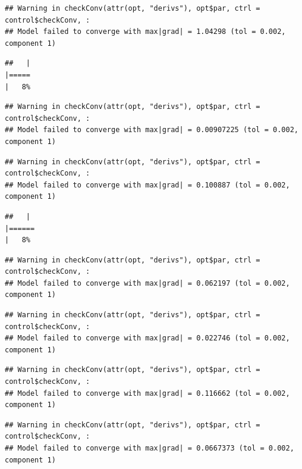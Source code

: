 \documentclass[
  12pt,
]{book}
\begin{document}
\begin{verbatim}
## Warning in checkConv(attr(opt, "derivs"), opt$par, ctrl = control$checkConv, :
## Model failed to converge with max|grad| = 1.04298 (tol = 0.002, component 1)
\end{verbatim}

\begin{verbatim}
##   |                                                                              |=====                                                                 |   8%
\end{verbatim}

\begin{verbatim}
## Warning in checkConv(attr(opt, "derivs"), opt$par, ctrl = control$checkConv, :
## Model failed to converge with max|grad| = 0.00907225 (tol = 0.002, component 1)
\end{verbatim}

\begin{verbatim}
## Warning in checkConv(attr(opt, "derivs"), opt$par, ctrl = control$checkConv, :
## Model failed to converge with max|grad| = 0.100887 (tol = 0.002, component 1)
\end{verbatim}

\begin{verbatim}
##   |                                                                              |======                                                                |   8%
\end{verbatim}

\begin{verbatim}
## Warning in checkConv(attr(opt, "derivs"), opt$par, ctrl = control$checkConv, :
## Model failed to converge with max|grad| = 0.062197 (tol = 0.002, component 1)
\end{verbatim}

\begin{verbatim}
## Warning in checkConv(attr(opt, "derivs"), opt$par, ctrl = control$checkConv, :
## Model failed to converge with max|grad| = 0.022746 (tol = 0.002, component 1)
\end{verbatim}

\begin{verbatim}
## Warning in checkConv(attr(opt, "derivs"), opt$par, ctrl = control$checkConv, :
## Model failed to converge with max|grad| = 0.116662 (tol = 0.002, component 1)
\end{verbatim}

\begin{verbatim}
## Warning in checkConv(attr(opt, "derivs"), opt$par, ctrl = control$checkConv, :
## Model failed to converge with max|grad| = 0.0667373 (tol = 0.002, component 1)
\end{verbatim}
\end{document}
